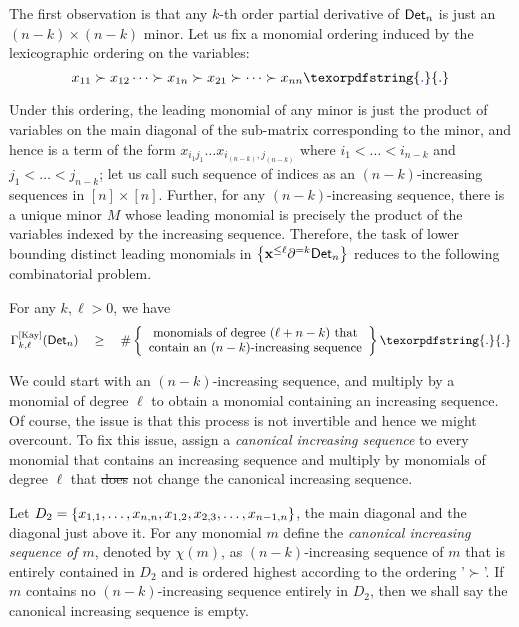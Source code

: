 \documentclass{birkjour}
\newcommand{\CM}[1]{\Gamma^{\mathrm{[#1]}}}
\newcommand{\spaced}[1]{\quad#1\quad}
\providecommand{\DIFaddtex}[1]{{\protect\color{blue}\uwave{#1}}} %
\providecommand{\DIFdeltex}[1]{{\protect\color{red}\sout{#1}}}                      %
\providecommand{\DIFaddbegin}{} %
\providecommand{\DIFaddend}{} %
\providecommand{\DIFdelbegin}{} %
\providecommand{\DIFdelend}{} %
\providecommand{\DIFadd}[1]{\texorpdfstring{\DIFaddtex{#1}}{#1}} %
\providecommand{\DIFdel}[1]{\texorpdfstring{\DIFdeltex{#1}}{}} %
\begin{document}
The first observation is that any $k$-th order partial derivative of $\mathsf{Det}_n$ is just an $(n-k)\times (n-k)$ minor. Let us fix a monomial ordering induced by the lexicographic ordering on the variables:
$$
x_{11} \succ x_{12} \dots \succ x_{1n} \succ x_{21} \succ \dots \succ x_{nn}\DIFaddbegin \DIFadd{.
}\DIFaddend $$
Under this ordering, the leading monomial of any minor is just the product of variables on the main diagonal of the sub-matrix corresponding to the minor, and hence is a term of the form $x_{i_1j_1}\dots x_{i_{(n-k)},j_{(n-k)}}$ where $i_1 < \dots < i_{n-k}$ and $j_1 < \dots < j_{n-k}$; let us call such \DIFaddbegin \DIFadd{a }\DIFaddend sequence of indices as an $(n-k)$-increasing sequences in $[n]\times [n]$. Further, for any $(n-k)$-increasing sequence, there is a unique minor $M$ whose leading monomial is precisely the product of the variables indexed by the increasing sequence. Therefore, the task of lower bounding distinct leading monomials in $\left\{\mathbf{x}^{\leq \ell}\partial^{=k}\mathsf{Det}_n\right\}$ reduces to the following combinatorial problem.
\begin{claim} For any $k,\ell > 0$,  we have
$$
\CM{Kay}_{k,\ell}(\Det_n) \spaced{\geq} \#\inbrace{\begin{array}{cc}\text{monomials of degree $(\ell + n -k)$ that}\\\text{contain an $(n-k)$-increasing sequence}\end{array}}\DIFaddbegin \DIFadd{.
}\DIFaddend $$
\end{claim}

We could start with an $(n-k)$-increasing sequence, and multiply by a monomial of degree $\ell$ to obtain a monomial containing an increasing sequence. Of course, the issue is that this process is not invertible and hence we might overcount. To fix this issue, \cite{gkks13} assign a \emph{canonical increasing sequence} to every monomial that contains an increasing sequence and multiply by monomials of degree $\ell$ that \DIFdelbegin \DIFdel{does }\DIFdelend \DIFaddbegin \DIFadd{do }\DIFaddend not change the canonical increasing sequence. 

\begin{definition}
Let $D_2 = \left\{x_{1,1},\dots, x_{n,n}, x_{1,2},x_{2,3}, \dots, x_{n-1,n}\right\}$, the main diagonal and the diagonal just above it. For any monomial $m$ define the \emph{canonical increasing sequence of $m$}, denoted by $\chi(m)$, as $(n-k)$-increasing sequence of $m$ that is entirely contained in $D_2$ and is ordered highest according to the ordering '$\succ$'. If $m$ contains no $(n-k)$-increasing sequence entirely in $D_2$, then we shall say the canonical increasing sequence is empty. 
\end{definition}
\end{document}
